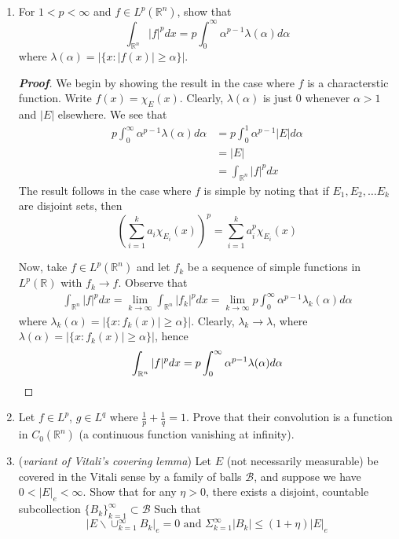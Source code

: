 \documentclass[12pt,leqno]{book}
\theoremstyle{definition}
\newcommand{\R}{\mathbb{R}}
\newenvironment{Proof}{\begin{proof}[\textnormal{\textbf{Proof}}]}{\end{proof}}
\begin{document}
\begin{enumerate}
\begin{Proof}
\end{Proof}

 \item For $1<p<\infty$ and $f \in L^p(\R^n)$, show that \[\int_{\R^n}|f|^pdx=p\int_0^{\infty} \alpha^{p-1}\lambda(\alpha)d\alpha\] where $\lambda(\alpha)=|\{x:|f(x)|\geq\alpha\}|$. 

\begin{Proof}
 We begin by showing the result in the case where $f$ is a characterstic function. Write $f(x)=\chi_E(x)$. Clearly, $\lambda(\alpha)$ is just 0 whenever $\alpha>1$ and $|E|$ elsewhere. We see that \begin{align*}p\int_0^{\infty}\alpha^{p-1}\lambda(\alpha)d\alpha&=p\int_0^1\alpha^{p-1}|E|d\alpha\\&=|E|\\&=\int_{\R^n}|f|^pdx\end{align*} The result follows in the case where $f$ is simple by noting that if $E_1,E_2,\hdots E_k$ are disjoint sets, then \[\left(\sum_{i=1}^ka_i\chi_{E_i}(x)\right)^p=\sum_{i=1}^ka_i^p\chi_{E_i}(x)\] 

Now, take $f\in L^p(\R^n)$ and let $f_k$ be a sequence of simple functions in $L^p(\R)$ with $f_k\to f$. Observe that \begin{align*}\int_{\R^n}|f|^pdx=\lim_{k\to\infty}\int_{\R^n}|f_k|^pdx=\lim_{k\to\infty}p\int_0^{\infty}\alpha^{p-1} \lambda_k(\alpha)d\alpha\end{align*} where $\lambda_k(\alpha)=|\{x:f_k(x)|\geq\alpha\}|$. Clearly, $\lambda_k\to\lambda$, where $\lambda(\alpha)=|\{x:f_k(x)|\geq\alpha\}|$, hence \[\int_{\R^n}|f|^pdx=p\int_0^{\infty} \alpha^{p-1}\lambda(\alpha)d\alpha\qedhere\]
\end{Proof}

 \item Let $f \in L^p$, $g \in L^q$ where $\frac1p + \frac1q = 1$.  Prove that their convolution is a function in $C_0(\R^n)$ (a continuous function vanishing at infinity). 
 \item (\textit{variant of Vitali's covering lemma})  Let $E$ (not necessarily measurable) be covered in the Vitali sense by a family of balls $\mathcal B$, and suppose we have $0< |E|_e< \infty$.  Show that for any $\eta >0$, there exists a disjoint, countable subcollection $\{B_k\}_{k=1}^\infty \subset \mathcal B$ Such that $$|E \backslash \cup_{k=1}^\infty B_k|_e = 0\text{  and  }\Sigma_{k=1}^\infty | B_k| \leq (1+\eta)|E|_e$$
\end{enumerate}
\end{document}
